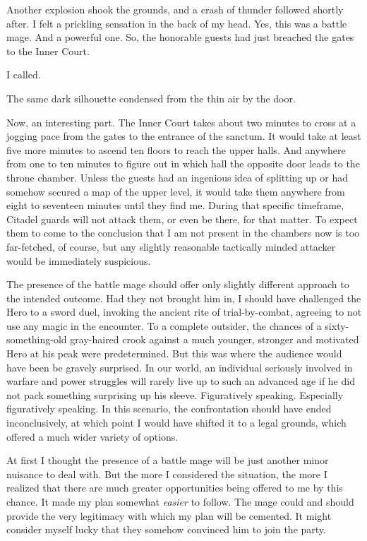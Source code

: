 Another explosion shook the grounds, and a crash of thunder followed shortly after. I felt a prickling sensation in the back of my head. Yes, this was a battle mage. And a powerful one. So, the honorable guests had just breached the gates to the Inner Court.

 I called.

 The same dark silhouette condensed from the thin air by the door.



Now, an interesting part. The Inner Court takes about two minutes to cross at a jogging pace from the gates to the entrance of the sanctum. It would take at least five more minutes to ascend ten floors to reach the upper halls. And anywhere from one to ten minutes to figure out in which hall the opposite door leads to the throne chamber. Unless the guests had an ingenious idea of splitting up or had somehow secured a map of the upper level, it would take them anywhere from eight to seventeen minutes until they find me. During that specific timeframe, Citadel guards will not attack them, or even be there, for that matter. To expect them to come to the conclusion that I am not present in the chambers now is too far-fetched, of course, but any slightly reasonable tactically minded attacker would be immediately suspicious.

The presence of the battle mage should offer only slightly different approach to the intended outcome. Had they not brought him in, I should have challenged the Hero to a sword duel, invoking the ancient rite of trial-by-combat, agreeing to not use any magic in the encounter. To a complete outsider, the chances of a sixty-something-old gray-haired crook against a much younger, stronger and motivated Hero at his peak were predetermined. But this was where the audience would have been be gravely surprised. In our world, an individual seriously involved in warfare and power struggles will rarely live up to such an advanced age if he did not pack something surprising up his sleeve. Figuratively speaking. Especially figuratively speaking. In this scenario, the confrontation should have ended inconclusively, at which point I would have shifted it to a legal grounds, which offered a much wider variety of options.

At first I thought the presence of a battle mage will be just another minor nuisance to deal with. But the more I considered the situation, the more I realized that there are much greater opportunities being offered to me by this chance. It made my plan somewhat \textit{easier} to follow. The mage could and should provide the very legitimacy with which my plan will be cemented. It might consider myself lucky that they somehow convinced him to join the party.

